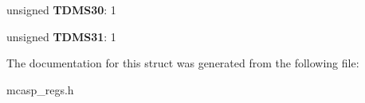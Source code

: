\begin{DoxyCompactItemize}
\item 
\hypertarget{structMCASP__TDMS_aed9e29a3cb55dadea715ab7bef37ffb4}{unsigned {\bfseries T\-D\-M\-S30}\-: 1}\label{structMCASP__TDMS_aed9e29a3cb55dadea715ab7bef37ffb4}

\item 
\hypertarget{structMCASP__TDMS_a82976be5623e7659cdc65614f5bc4e04}{unsigned {\bfseries T\-D\-M\-S31}\-: 1}\label{structMCASP__TDMS_a82976be5623e7659cdc65614f5bc4e04}

\end{DoxyCompactItemize}


The documentation for this struct was generated from the following file\-:\begin{DoxyCompactItemize}
\item 
mcasp\-\_\-regs.\-h\end{DoxyCompactItemize}
